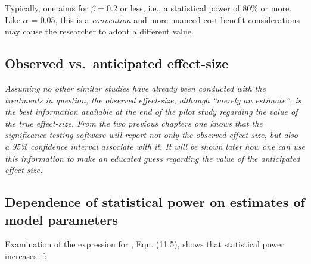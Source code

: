 \documentclass[
]{book}
\begin{document}
Typically, one aims for \(\beta = 0.2\) or less, i.e., a statistical power of 80\% or more. Like \(\alpha\) = 0.05, this is a \emph{convention} and more nuanced cost-benefit considerations may cause the researcher to adopt a different value.

\hypertarget{observed-vs.-anticipated-effect-size}{%
\subsection{Observed vs.~anticipated effect-size}\label{observed-vs.-anticipated-effect-size}}

\emph{Assuming no other similar studies have already been conducted with the treatments in question, the observed effect-size, although ``merely an estimate'', is the best information available at the end of the pilot study regarding the value of the true effect-size. From the two previous chapters one knows that the significance testing software will report not only the observed effect-size, but also a 95\% confidence interval associate with it. It will be shown later how one can use this information to make an educated guess regarding the value of the anticipated effect-size.}

\hypertarget{RocSampleSizeDBM-dependence-of-stats-power}{%
\subsection{Dependence of statistical power on estimates of model parameters}\label{RocSampleSizeDBM-dependence-of-stats-power}}

Examination of the expression for , Eqn. (11.5), shows that statistical power increases if:
\end{document}
